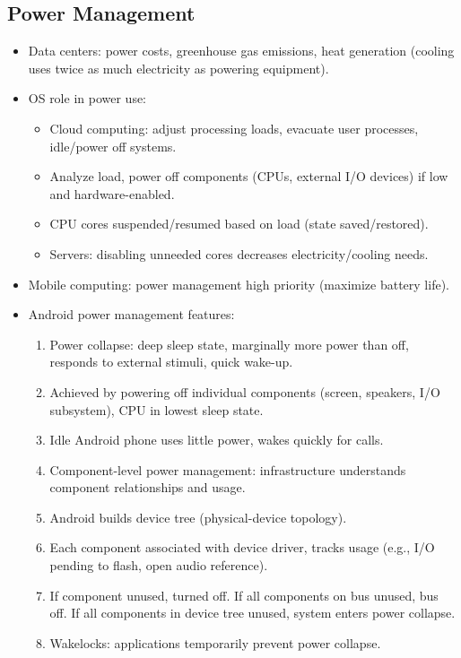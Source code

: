 \subsection{Power Management}
\begin{itemize}
    \item Data centers: power costs, greenhouse gas emissions, heat generation (cooling uses twice as much electricity as powering equipment).
    \item OS role in power use:
    \begin{itemize}
        \item Cloud computing: adjust processing loads, evacuate user processes, idle/power off systems.
        \item Analyze load, power off components (CPUs, external I/O devices) if low and hardware-enabled.
        \item CPU cores suspended/resumed based on load (state saved/restored).
        \item Servers: disabling unneeded cores decreases electricity/cooling needs.
    \end{itemize}
    \item Mobile computing: power management high priority (maximize battery life).
    \item Android power management features:
    \begin{enumerate}
        \item Power collapse: deep sleep state, marginally more power than off, responds to external stimuli, quick wake-up.
        \item Achieved by powering off individual components (screen, speakers, I/O subsystem), CPU in lowest sleep state.
        \item Idle Android phone uses little power, wakes quickly for calls.
        \item Component-level power management: infrastructure understands component relationships and usage.
        \item Android builds device tree (physical-device topology).
        \item Each component associated with device driver, tracks usage (e.g., I/O pending to flash, open audio reference).
        \item If component unused, turned off. If all components on bus unused, bus off. If all components in device tree unused, system enters power collapse.
        \item Wakelocks: applications temporarily prevent power collapse.

\end{enumerate}
\end{itemize}
